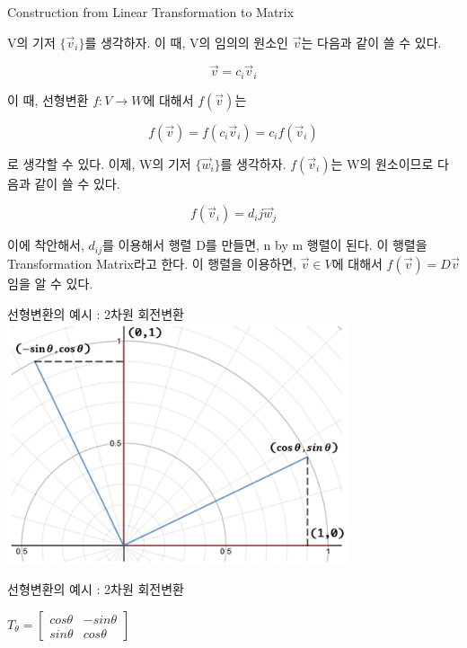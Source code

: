 \documentclass{beamer}
\begin{document}
\begin{frame}[allowframebreaks]{Construction from Linear Transformation to Matrix  }

V의 기저 $\{\vec{v}_i\}$를 생각하자. 이 때, V의 임의의 원소인 $\vec{v}$는 다음과 같이 쓸 수 있다. 

\begin{equation} 
\vec{v} = c_i \vec{v}_i
\end{equation}

이 때, 선형변환 $f:V \rightarrow W$에 대해서 $f(\vec{v})$는 

\begin{equation}
f(\vec{v}) = f(c_i \vec{v}_i) = c_i f(\vec{v}_i)
\end{equation} 

로 생각할 수 있다. 이제, W의 기저 $\{\vec{w}_i\}$를 생각하자. $f(\vec{v}_i)$는 W의 원소이므로 다음과 같이 쓸 수 있다. 

\begin{equation}
f(\vec{v}_i) = d_ij \vec{w}_j
\end{equation} 

이에 착안해서, $d_{ij}$를 이용해서 행렬 D를 만들면, n by m 행렬이 된다. 이 행렬을 Transformation Matrix라고 한다. 이 행렬을 이용하면, $\vec{v} \in V$에 대해서 $f(\vec{v}) =  D \vec{v}$ 임을 알 수 있다. 

\end{frame}

\begin{frame}{선형변환의 예시 : 2차원 회전변환} 
\includegraphics[width=10cm,keepaspectratio]{rot}

\end{frame}

\begin{frame}{선형변환의 예시 : 2차원 회전변환}

$T_{\theta} = 
\left[ \begin{matrix}
cos \theta & - sin \theta  \\
sin \theta & cos \theta 
\end{matrix} \right] $
\end{frame}
\end{document}
